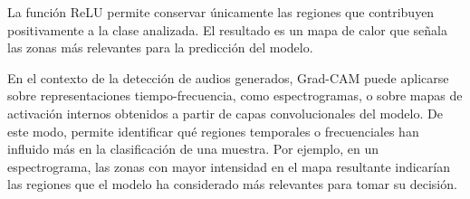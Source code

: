 La función ReLU permite conservar únicamente las regiones que contribuyen positivamente a la clase analizada. El resultado es un mapa de calor que señala las zonas más relevantes para la predicción del modelo.

En el contexto de la detección de audios generados, Grad-CAM puede aplicarse sobre representaciones tiempo-frecuencia, como espectrogramas, o sobre mapas de activación internos obtenidos a partir de capas convolucionales del modelo. De este modo, permite identificar qué regiones temporales o frecuenciales han influido más en la clasificación de una muestra. Por ejemplo, en un espectrograma, las zonas con mayor intensidad en el mapa resultante indicarían las regiones que el modelo ha considerado más relevantes para tomar su decisión.
